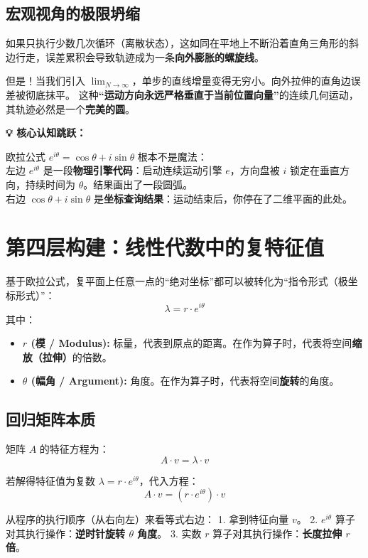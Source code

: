 \documentclass[12pt, a4paper]{article}
\newenvironment{insight}{
    \def\FrameCommand{\fboxsep=1em\colorbox{graybg}}
    \MakeFramed{\advance\hsize-\width\FrameRestore}
    \textbf{\textcolor{primary}{\large 💡 核心认知跳跃：}} \par\vspace{0.5em}
}{
    \endMakeFramed
}
\begin{document}
\subsection{宏观视角的极限坍缩}
如果只执行少数几次循环（离散状态），这如同在平地上不断沿着直角三角形的斜边行走，误差累积会导致轨迹成为一条\textbf{向外膨胀的螺旋线}。

但是！当我们引入 $\lim_{N \to \infty}$，单步的直线增量变得无穷小。向外拉伸的直角边误差被彻底抹平。
这种\textbf{“运动方向永远严格垂直于当前位置向量”}的连续几何运动，其轨迹必然是一个\textbf{完美的圆}。

\begin{insight}
    欧拉公式 $e^{i\theta} = \cos\theta + i\sin\theta$ 根本不是魔法：\\
    左边 $e^{i\theta}$ 是一段\textbf{物理引擎代码}：启动连续运动引擎 $e$，方向盘被 $i$ 锁定在垂直方向，持续时间为 $\theta$。结果画出了一段圆弧。\\
    右边 $\cos\theta + i\sin\theta$ 是\textbf{坐标查询结果}：运动结束后，你停在了二维平面的此处。
\end{insight}

\section{第四层构建：线性代数中的复特征值}

基于欧拉公式，复平面上任意一点的“绝对坐标”都可以被转化为“指令形式（极坐标形式）”：
\begin{equation}
    \lambda = r \cdot e^{i\theta}
\end{equation}
其中：
\begin{itemize}
    \item \textbf{$r$ (模 / Modulus):} 标量，代表到原点的距离。在作为算子时，代表将空间\textbf{缩放（拉伸）}的倍数。
    \item \textbf{$\theta$ (幅角 / Argument):} 角度。在作为算子时，代表将空间\textbf{旋转}的角度。
\end{itemize}

\subsection{回归矩阵本质}
矩阵 $A$ 的特征方程为：
$$ A \cdot v = \lambda \cdot v $$

若解得特征值为复数 $\lambda = r \cdot e^{i\theta}$，代入方程：
$$ A \cdot v = (r \cdot e^{i\theta}) \cdot v $$

从程序的执行顺序（从右向左）来看等式右边：
1. 拿到特征向量 $v$。
2. $e^{i\theta}$ 算子对其执行操作：\textbf{逆时针旋转 $\theta$ 角度}。
3. 实数 $r$ 算子对其执行操作：\textbf{长度拉伸 $r$ 倍}。
\end{document}
